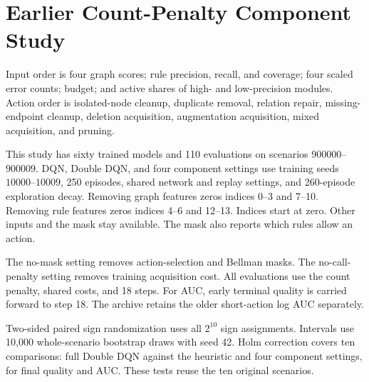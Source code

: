 \section{Earlier Count-Penalty Component Study}

\label{app:impl}

Input order is four graph scores; rule precision, recall, and coverage;
four scaled error counts; budget; and active shares of high- and
low-precision modules. Action order is isolated-node cleanup, duplicate
removal, relation repair, missing-endpoint cleanup, deletion acquisition,
augmentation acquisition, mixed acquisition, and pruning.

This study has sixty trained models and 110 evaluations on scenarios
$900000$--$900009$. DQN, Double DQN, and four component settings use
training seeds $10000$--$10009$, 250 episodes, shared network and replay
settings, and 260-episode exploration decay.
Removing graph features zeros indices 0--3 and 7--10.
Removing rule features zeros indices 4--6 and 12--13.
Indices start at zero. Other inputs and the mask stay available.
The mask also reports which rules allow an action.

The no-mask setting removes action-selection and Bellman masks.
The no-call-penalty setting removes training acquisition cost.
All evaluations use the count penalty, shared costs, and 18 steps.
For AUC, early terminal quality is carried forward to step 18.
The archive retains the older short-action log AUC separately.

Two-sided paired sign randomization uses all $2^{10}$ sign assignments.
Intervals use 10,000 whole-scenario bootstrap draws with seed 42.
Holm correction covers ten comparisons: full Double DQN against
the heuristic and four component settings, for final quality and AUC.
These tests reuse the ten original scenarios.

